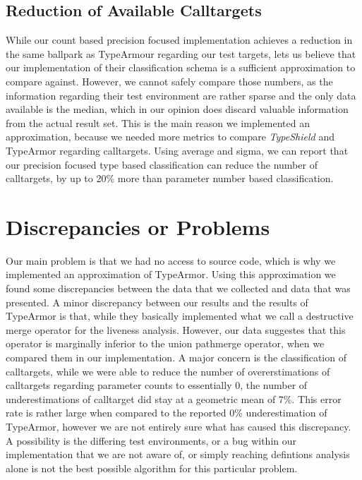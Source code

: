 \subsection{Reduction of Available Calltargets}
While our count based precision focused implementation achieves a reduction in the same ballpark as TypeArmour regarding our test targets, lets us believe that our implementation of their classification schema is a sufficient approximation to compare against. However, we cannot safely compare those numbers, as the information regarding their test environment are rather sparse and the only data available is the median, which in our opinion does discard valuable information from the actual result set. This is the main reason we implemented an approximation, because we needed more metrics to compare \textit{TypeShield} and TypeArmor regarding calltargets. Using average and sigma, we can report that our precision focused type based classification can reduce the number of calltargets, by up to 20\% more than parameter number based classification.


\section{Discrepancies or Problems}
Our main problem is that we had no access to source code, which is why we implemented an approximation of TypeArmor. Using this approximation we found some discrepancies between the data that we collected and data that was presented.
A minor discrepancy between our results and the results of TypeArmor is that, while they basically implemented what we call a destructive merge operator for the liveness analysis. However, our data suggestes that this operator is marginally inferior to the union pathmerge operator, when we compared them in our implementation.
A major concern is the classification of calltargets, while we were able to reduce the number of overerstimations of calltargets regarding parameter counts to essentially 0, the number of underestimations of calltarget did stay at a geometric mean of 7\%. This error rate is rather large when compared to the reported 0\% underestimation of TypeArmor, however we are not entirely sure what has caused this discrepancy. A possibility is the differing test environments, or a bug within our implementation that we are not aware of, or simply reaching defintions analysis alone is not the best possible algorithm for this particular problem.


